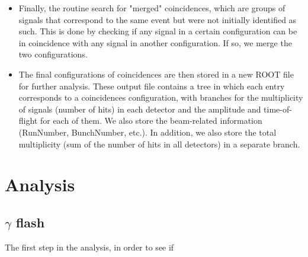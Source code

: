 \documentclass{article}
\begin{document}
\begin{itemize}
    \item Finally, the routine search for "merged" coincidences, which are groups of signals that correspond to the same event but were not initially identified as such. This is done by checking if any signal in a certain configuration can be in coincidence with any signal in another configuration. If so, we merge the two configurations.
    \item The final configurations of coincidences are then stored in a new ROOT file for further analysis. These output file contains a tree in which each entry corresponds to a coincidences configuration, with branches for the multiplicity of signals (number of hits) in each detector and the amplitude and time-of-flight for each of them. We also store the beam-related information (RunNumber, BunchNumber, etc.). In addition, we also store the total multiplicity (sum of the number of hits in all detectors) in a separate branch.
\end{itemize}   

\section{Analysis}

\subsection{$\gamma$ flash}
The first step in the analysis, in order to see if
 
\end{document}
